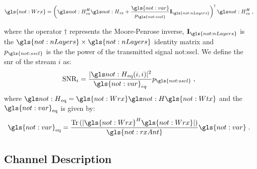 \begin{equation}
\label{eq.:Wrx}
\gls{not:Wrx} =
\left(
\channel_{\textrm{rx}}^H
\channel_{\textrm{rx}}
+
\frac{ \gls{not:var} }{ p_{\gls{not:sscl}} }
\mathbf{I}_{\gls{not:nLayers}} \right)^\dagger
\channel_{\textrm{rx}}^H \;,
\end{equation}

\noindent where the operator $\dagger$ represents the Moore-Penrose inverse, $\mathbf{ I}_{\gls{not:nLayers}} $ is the $\gls{not:nLayers} \times \gls{not:nLayers}$ identity matrix and $p_{\gls{not:sscl}}$ is the the power of the transmitted signal \gls{not:sscl}.
%
We define the \gls{snr} of the stream $i$ as:
%
\begin{equation}
\label{eq.:snr}
\textrm{SNR}_i = \frac{ \abs{
		\channel_{\textrm{eq}} (i,i)
	}^2 }{\gls{not:var}_{eq}} p_{\gls{not:sscl}} \; ,
\end{equation}
%
where $\channel_{\textrm{eq}} = \gls{not:Wrx} \channel \gls{not:Wtx}$ and the $\gls{not:var}_{\textrm{eq}}$ is given by:
%
\begin{equation}
\gls{not:var}_{\textrm{eq}} = \frac{
	\Tr \,  (\abs{ \gls{not:Wrx}^H \gls{not:Wrx} } )}
{\gls{not:rxAnt}}
\gls{not:var} \;.
\end{equation}

\subsection{Channel Description}


